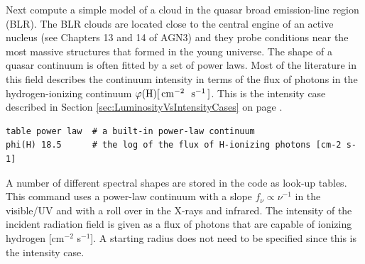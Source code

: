 \documentclass[12pt,twoside]{article}
\begin{document}
{Next compute a simple model of a cloud in the quasar
broad emission-line region (BLR).
The BLR clouds are located close to the central engine of an active nucleus
(see Chapters 13 and 14 of AGN3) and they probe conditions near the most
massive structures that formed in the young universe.  The shape of a quasar
continuum is often fitted by a set of power laws.  Most of the literature
in this field describes the continuum intensity in terms of the flux of
photons in the hydrogen-ionizing continuum
$\varphi(\mathrm{H}) [ \mbox{${\rm\thinspace cm}^{-2}\,$}\ \mbox{${\rm\thinspace s}^{-1}\,$} ]$.
This is the intensity case described in
Section \ref{sec:LuminosityVsIntensityCases}
on page \pageref{sec:LuminosityVsIntensityCases}.
\small
\begin{verbatim}
table power law  # a built-in power-law continuum
phi(H) 18.5      # the log of the flux of H-ionizing photons [cm-2 s-1]
\end{verbatim}
\normalsize
A number of different spectral shapes are stored in the code as look-up
tables.  This  command uses
a power-law continuum with a slope $f_\nu \propto \nu^{-1}$
in the visible/UV and with a roll over in the X-rays and infrared.
The intensity of the incident radiation field is given as a flux of
photons that are capable of ionizing hydrogen [cm$^{-2}$ s$^{-1}$].
A starting radius does not need to be specified since this is
the intensity case.

}
\end{document}
